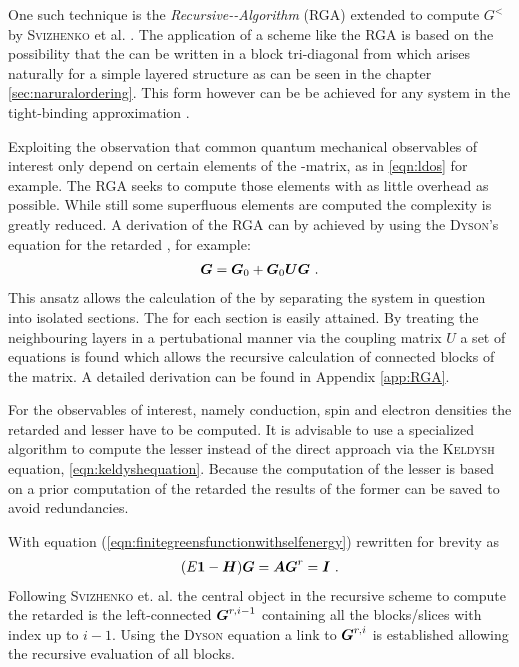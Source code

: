 \label{sec:rgapresentation}
One such technique is the \emph{Recursive-\gfnc-Algorithm} (RGA) \cite{MacKinnon1985} extended to compute $G^<$ by \textsc{Svizhenko} et al. \cite{JApplPhys.91.2343}.
The application of a scheme like the RGA is based on the possibility that the \hamil{} can be written in a block tri-diagonal from which arises naturally for a simple layered structure as can be seen in the chapter \ref{sec:naruralordering}.
This form however can be be achieved for any system in the tight-binding approximation \cite{Wimmer2009Thesis}.\par
{}Exploiting the observation that common quantum mechanical observables of interest only depend on certain elements of the \gfnc-matrix, as in \cref{eqn:ldos} for example. The RGA seeks to compute those elements with as little overhead as possible. While still some superfluous elements are computed the complexity is greatly reduced. A derivation of the RGA can by achieved by using the \textsc{Dyson}'s equation for the retarded \gfnc{}, for example:
\begin{align}
	\boldsymbol{G} = \boldsymbol{G}_0+\boldsymbol{G}_0\boldsymbol{U}\boldsymbol{G}\ .
	\label{eqn:DysonEquationG}
\end{align}
This ansatz allows the calculation of the \gfnc{} by separating the system in question into isolated sections. The \gfnc{} for each section is easily attained. By treating the neighbouring layers in a pertubational manner via the coupling matrix $U$ a set of equations is found which allows the recursive calculation of connected blocks of the \gfnc{} matrix. A detailed derivation can be found in Appendix \ref{app:RGA}.\par
For the observables of interest, namely conduction, spin and electron densities the retarded and lesser \gfnc{} have to be computed.
It is advisable to use a specialized algorithm to compute the lesser \gfnc{} instead of the direct approach via the \textsc{Keldysh} equation, \cref{eqn:keldyshequation}. Because the computation of the lesser \gfnc{} is based on a prior computation of the retarded \gfnc{} the results of the former can be saved to avoid redundancies.\par
With equation (\ref{eqn:finitegreensfunctionwithselfenergy}) rewritten for brevity as
\begin{align}
(E\boldsymbol{1}-\boldsymbol{H})\boldsymbol{G} = \boldsymbol{A}\boldsymbol{G}^r=\boldsymbol{I}\ .
\label{eqn:amatrix}
\end{align}
Following \textsc{Svizhenko} et. al. the central object in the recursive scheme to compute the retarded \gfnc{} is the left-connected \gfnc{} $\boldsymbol{G}^{r,i-1}$ containing all the blocks/slices with index up to $i-1$. Using the \textsc{Dyson} equation a link to $\boldsymbol{G}^{r,i}$ is established allowing the recursive evaluation of all blocks.\par
